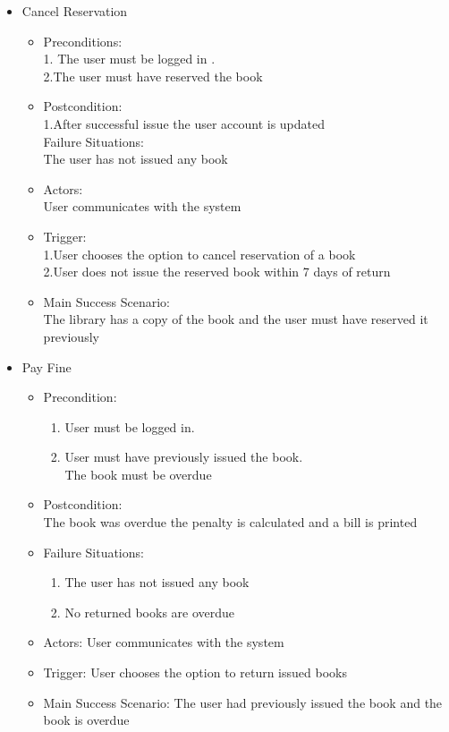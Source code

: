 \documentclass{article}
\begin{document}
\begin{enumerate}
\begin{itemize}
 \item Cancel Reservation\\
 \begin{itemize}
 \item  Preconditions:\\
 1. The user must be logged in .\\
 2.The user must have reserved the book\\
 \item Postcondition:\\
 1.After successful issue the user account is updated \\
Failure Situations:\\The user has not issued any book\\
 \item Actors: \\User communicates with the system\\
 \item Trigger:\\ 
 1.User chooses the option to cancel reservation of a book \\
 2.User does not issue the reserved book within 7 days of return\\
 \item Main Success Scenario:\\ The library has a copy of the book and the user must have reserved it previously\\
	
 \end{itemize}

\item Pay Fine\\
	\begin{itemize}
	\item  Precondition:\\
	\begin{enumerate}	
	\item User must be logged in.\\
	\item User must have previously issued the book.\\The book must be overdue\\
	\end{enumerate}
 \item Postcondition:\\
  The book was overdue the penalty is calculated and a bill is printed 
 \item Failure Situations:
 \begin{enumerate}
 \item The user has not issued any book
  \item No returned books are overdue
	\end{enumerate} 
 \item Actors: User communicates with the system
 \item Trigger: User chooses the option to return issued books
 \item Main Success Scenario: The user had previously issued the book and the book is overdue
	\end{itemize}
\end{itemize}



\end{enumerate}
\end{document}
